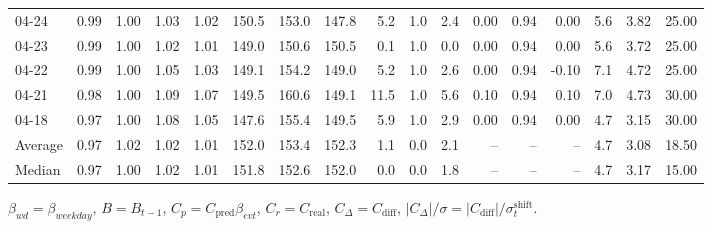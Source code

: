 \begin{threeparttable}
{\begin{tabular}{lrrrrrrrrrrrrrrrr}
  04-24 &         0.99 &           1.00 &          1.03 &          1.02 & 150.5 & 153.0 & 147.8 &        5.2 &                      1.0 &                 2.4 &       0.00 &      0.94 &           0.00 &              5.6 &            3.82 &                  25.00 \\
  04-23 &         0.99 &           1.00 &          1.02 &          1.01 & 149.0 & 150.6 & 150.5 &        0.1 &                      1.0 &                 0.0 &       0.00 &      0.94 &           0.00 &              5.6 &            3.72 &                  25.00 \\
  04-22 &         0.99 &           1.00 &          1.05 &          1.03 & 149.1 & 154.2 & 149.0 &        5.2 &                      1.0 &                 2.6 &       0.00 &      0.94 &          -0.10 &              7.1 &            4.72 &                  25.00 \\
  04-21 &         0.98 &           1.00 &          1.09 &          1.07 & 149.5 & 160.6 & 149.1 &       11.5 &                      1.0 &                 5.6 &       0.10 &      0.94 &           0.10 &              7.0 &            4.73 &                  30.00 \\
  04-18 &         0.97 &           1.00 &          1.08 &          1.05 & 147.6 & 155.4 & 149.5 &        5.9 &                      1.0 &                 2.9 &       0.00 &      0.94 &           0.00 &              4.7 &            3.15 &                  30.00 \\
Average &         0.97 &           1.02 &          1.02 &          1.01 & 152.0 & 153.4 & 152.3 &        1.1 &                      0.0 &                 2.1 &         -- &        -- &             -- &              4.7 &            3.08 &                  18.50 \\
 Median &         0.97 &           1.00 &          1.02 &          1.01 & 151.8 & 152.6 & 152.0 &        0.0 &                      0.0 &                 1.8 &         -- &        -- &             -- &              4.7 &            3.17 &                  15.00 \\
\bottomrule
\end{tabular}
}
\begin{tablenotes}\footnotesize
\item $\beta_{wd}=\beta_{weekday}$, $B=B_{t-1}$,
$C_p=C_{\text{pred}}\beta_{evt}$, $C_r=C_{\text{real}}$,
$C_\Delta=C_{\text{diff}}$, $|C_\Delta|/\sigma=|C_{\text{diff}}|/\sigma_t^{\text{shift}}$.
\end{tablenotes}
\end{threeparttable}
\endgroup
